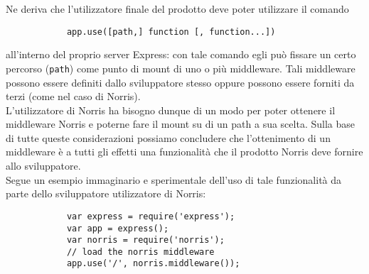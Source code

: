 		Ne deriva che l'utilizzatore finale del prodotto deve poter utilizzare il comando
		\begin{lstlisting}
			app.use([path,] function [, function...])
		\end{lstlisting}
		all'interno del proprio server Express: con tale comando egli può fissare un certo percorso (\texttt{path}) come punto di mount di uno o più middleware. Tali middleware possono essere definiti dallo sviluppatore stesso oppure possono essere forniti da terzi (come nel caso di Norris).\\
		L'utilizzatore di Norris ha bisogno dunque di un modo per poter ottenere il middleware Norris e poterne fare il mount su di un path a sua scelta. Sulla base di tutte queste considerazioni possiamo concludere che l'ottenimento di un middleware è a tutti gli effetti una funzionalità che il prodotto Norris deve fornire allo sviluppatore.\\
		Segue un esempio immaginario e sperimentale dell'uso di tale funzionalità da parte dello sviluppatore utilizzatore di Norris:
		\begin{lstlisting}
			var express = require('express');
			var app = express();
			var norris = require('norris');
			// load the norris middleware
			app.use('/', norris.middleware());
		\end{lstlisting}
